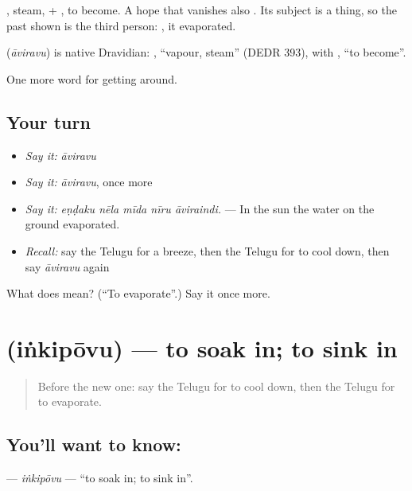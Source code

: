 , steam, + , to become. A hope that vanishes also . Its subject is a thing, so the past shown is the third person: , it evaporated.

\begin{cousinweb}
\textbf{} (\emph{āviravu}) is native Dravidian: , \textquotedblleft{}vapour, steam\textquotedblright{} (DEDR 393), with , \textquotedblleft{}to become\textquotedblright{}.
\end{cousinweb}

\begin{grammarlens}[title={What you've built}]
One more word for getting around.
\end{grammarlens}

\subsection*{Your turn}
\begin{itemize}
\raggedright
  \item \emph{Say it:} \emph{āviravu}
  \item \emph{Say it:} \emph{āviravu}, once more
  \item \emph{Say it:} \emph{eṇḍaku nēla mīda nīru āviraindi.} — In the sun the water on the ground evaporated.
  \item \emph{Recall:} say the Telugu for a breeze, then the Telugu for to cool down, then say \emph{āviravu} again
\end{itemize}

\begin{tcolorbox}[breakable,colback=teal!4,colframe=teal!35!black,title={Before you move on}]
What does  mean? (\textquotedblleft{}To evaporate\textquotedblright{}.) Say it once more.
\end{tcolorbox}
\section[\texorpdfstring{\te{ఇంకిపోవు} (iṅkipōvu)}{ఇంకిపోవు (iṅkipōvu)}]{ (iṅkipōvu) — to soak in; to sink in}

\label{lesson:TE-C483-inkipovu}



\begin{quote}
Before the new one: say the Telugu for to cool down, then the Telugu for to evaporate.
\end{quote}

\subsection*{You'll want to know: }
\textbf{} — \emph{iṅkipōvu} — \textquotedblleft{}to soak in; to sink in\textquotedblright{}.

